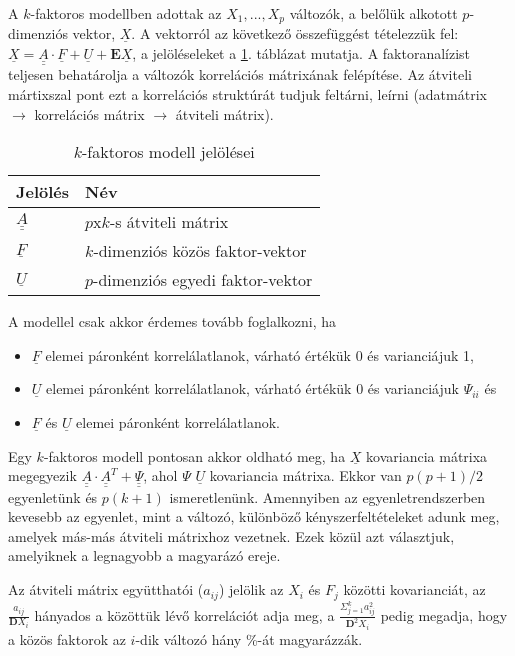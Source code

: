A $k$-faktoros modellben adottak az $X_1, ..., X_p$ változók, a belőlük alkotott $p$-dimenziós vektor, $\underline{X}$. A vektorról az következő összefüggést tételezzük fel: $\underline{X} = \underline{\underline{A}} \cdot \underline{F} + \underline{U} + \mathbf{E}\underline{X}$, a jelöléseleket a \ref{fig:k-modell}. táblázat mutatja. A faktoranalízist teljesen behatárolja a változók korrelációs mátrixának felépítése. Az átviteli mártixszal pont ezt a korrelációs struktúrát tudjuk feltárni, leírni (adatmátrix $\rightarrow$ korrelációs mátrix $\rightarrow$ átviteli mátrix).

\begin{table}[h]
\centering
\caption{$k$-faktoros modell jelölései} \label{fig:k-modell}
\begin{tabular}{|l|l|}
\hline
Jelölés & Név
\\ \hline
$\underline{\underline{A}}$ & $p$x$k$-s átviteli mátrix
\\ \hline
$\underline{F}$ & $k$-dimenziós közös faktor-vektor
\\ \hline
$\underline{U}$ & $p$-dimenziós egyedi faktor-vektor
\\ \hline
\end{tabular}
\end{table}

A modellel csak akkor érdemes tovább foglalkozni, ha
\begin{itemize}
\item $\underline{F}$ elemei páronként korrelálatlanok, várható értékük 0 és varianciájuk 1,
\item $\underline{U}$ elemei páronként korrelálatlanok, várható értékük 0 és varianciájuk $\Psi_{ii}$ és
\item $\underline{F}$ és $\underline{U}$ elemei páronként korrelálatlanok.
\end{itemize}

Egy $k$-faktoros modell pontosan akkor oldható meg, ha $\underline{X}$ kovariancia mátrixa megegyezik $\underline{\underline{A}} \cdot \underline{\underline{A}}^T +\underline{\underline{\Psi}}$, ahol $\Psi$ $\underline{U}$ kovariancia mátrixa. Ekkor van $p(p+1)/2$ egyenletünk és $p(k+1)$ ismeretlenünk. Amennyiben az egyenletrendszerben kevesebb az egyenlet, mint a változó, különböző kényszerfeltételeket adunk meg, amelyek más-más átviteli mátrixhoz vezetnek. Ezek közül azt választjuk, amelyiknek a legnagyobb a magyarázó ereje.

Az átviteli mátrix együtthatói ($a_{ij}$) jelölik az $X_i$ és $F_j$ közötti kovarianciát, az $\frac{a_{ij}}{\mathbf{D}X_i}$ hányados a közöttük lévő korrelációt adja meg, a $\frac{\Sigma_{j=1}^k a^2_{ij}}{\mathbf{D}^2X_i}$ pedig megadja, hogy a közös faktorok az $i$-dik változó hány \%-át magyarázzák.

